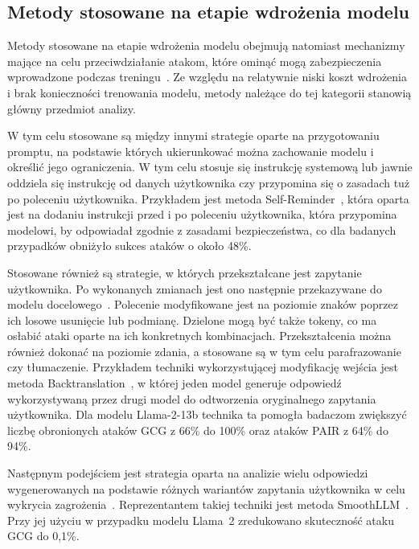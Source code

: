 \subsection{Metody stosowane na etapie wdrożenia modelu}
Metody stosowane na etapie wdrożenia modelu obejmują natomiast mechanizmy mające na celu przeciwdziałanie atakom, które ominąć mogą zabezpieczenia wprowadzone podczas treningu~\cite{correia2026systematicliteraturereviewllm}.
Ze względu na relatywnie niski koszt wdrożenia i brak konieczności trenowania modelu, metody należące do tej kategorii stanowią główny przedmiot analizy.

W tym celu stosowane są między innymi strategie oparte na przygotowaniu promptu, na podstawie których ukierunkować można zachowanie modelu i określić jego ograniczenia. W tym celu stosuje się instrukcję systemową lub jawnie oddziela się instrukcję od danych użytkownika czy przypomina się o zasadach tuż po poleceniu użytkownika.
Przykładem jest metoda Self-Reminder~\cite{wu2023selfreminder}, która oparta jest na dodaniu instrukcji przed i po poleceniu użytkownika, która przypomina modelowi, by odpowiadał zgodnie z zasadami bezpieczeństwa, co dla badanych przypadków obniżyło sukces ataków o około 48\%.

Stosowane również są strategie, w których przekształcane jest zapytanie użytkownika. Po wykonanych zmianach jest ono następnie przekazywane do modelu docelowego~\cite{correia2026systematicliteraturereviewllm}.
Polecenie modyfikowane jest na poziomie znaków poprzez ich losowe usunięcie lub podmianę. Dzielone mogą być także tokeny, co ma osłabić ataki oparte na ich konkretnych kombinacjach. Przekształcenia można również dokonać na poziomie zdania, a stosowane są w tym celu parafrazowanie czy tłumaczenie. Przykładem techniki wykorzystującej modyfikację wejścia jest metoda Backtranslation~\cite{wang2024defendingllmsjailbreakingattacks}, w której jeden model generuje odpowiedź wykorzystywaną przez drugi model do odtworzenia oryginalnego zapytania użytkownika. Dla modelu Llama-2-13b technika ta pomogła badaczom zwiększyć liczbę obronionych ataków GCG z 66\% do 100\% oraz ataków PAIR z 64\% do 94\%.

Następnym podejściem jest strategia oparta na analizie wielu odpowiedzi wygenerowanych na podstawie różnych wariantów zapytania użytkownika w celu wykrycia zagrożenia~\cite{correia2026systematicliteraturereviewllm}. Reprezentantem takiej techniki jest metoda SmoothLLM~\cite{robey2024smoothllmdefendinglargelanguage}. Przy jej użyciu w przypadku modelu Llama~2 zredukowano skuteczność ataku GCG do 0,1\%.

